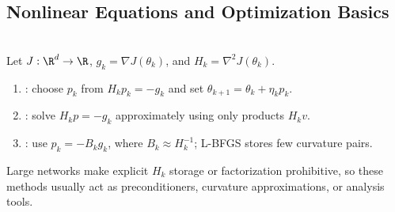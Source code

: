 \subsection{Nonlinear Equations and Optimization Basics}

\begin{remark} \label{rem:sl-second-order-methods} \\
Let $J:\R^d\to\R$, $g_k=\nabla J(\theta_k)$, and $H_k=\nabla^2J(\theta_k)$.
\begin{enumerate}[label=(\roman*)]
\setlength{\itemsep}{0pt}
\item {}: choose $p_k$ from $H_kp_k=-g_k$ and set $\theta_{k+1}=\theta_k+\eta_kp_k$.
\item {}: solve $H_kp=-g_k$ approximately using only products $H_kv$.
\item {}: use $p_k=-B_kg_k$, where $B_k\approx H_k^{-1}$; L-BFGS stores few curvature pairs.
\end{enumerate}
Large networks make explicit $H_k$ storage or factorization prohibitive, so these methods usually act as preconditioners, curvature approximations, or analysis tools.
\end{remark}
